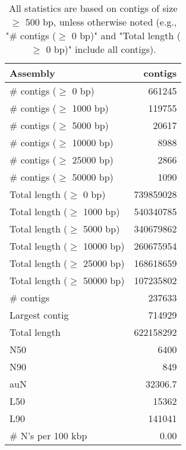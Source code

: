 \documentclass[12pt,a4paper]{article}
\begin{document}
\begin{table}[ht]
\begin{center}
\caption{All statistics are based on contigs of size $\geq$ 500 bp, unless otherwise noted (e.g., "\# contigs ($\geq$ 0 bp)" and "Total length ($\geq$ 0 bp)" include all contigs).}
\begin{tabular}{|l*{1}{|r}|}
\hline
Assembly & contigs \\ \hline
\# contigs ($\geq$ 0 bp) & 661245 \\ \hline
\# contigs ($\geq$ 1000 bp) & 119755 \\ \hline
\# contigs ($\geq$ 5000 bp) & 20617 \\ \hline
\# contigs ($\geq$ 10000 bp) & 8988 \\ \hline
\# contigs ($\geq$ 25000 bp) & 2866 \\ \hline
\# contigs ($\geq$ 50000 bp) & 1090 \\ \hline
Total length ($\geq$ 0 bp) & 739859028 \\ \hline
Total length ($\geq$ 1000 bp) & 540340785 \\ \hline
Total length ($\geq$ 5000 bp) & 340679862 \\ \hline
Total length ($\geq$ 10000 bp) & 260675954 \\ \hline
Total length ($\geq$ 25000 bp) & 168618659 \\ \hline
Total length ($\geq$ 50000 bp) & 107235802 \\ \hline
\# contigs & 237633 \\ \hline
Largest contig & 714929 \\ \hline
Total length & 622158292 \\ \hline
N50 & 6400 \\ \hline
N90 & 849 \\ \hline
auN & 32306.7 \\ \hline
L50 & 15362 \\ \hline
L90 & 141041 \\ \hline
\# N's per 100 kbp & 0.00 \\ \hline
\end{tabular}
\end{center}
\end{table}
\end{document}
